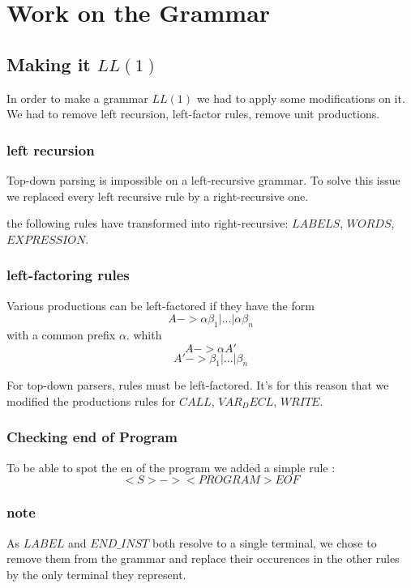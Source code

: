 \newpage\cleardoublepage{}
\section{Work on the Grammar}


\subsection{Making it $LL(1)$}
In order to make a grammar $LL(1)$ we had to apply some modifications on it. We had to remove left recursion, left-factor rules, remove unit productions.

\subsubsection{left recursion}

Top-down parsing is impossible on a left-recursive grammar. To solve this issue we replaced every left recursive rule by a right-recursive one.

the following rules have transformed into right-recursive: $LABELS$, $WORDS$, $EXPRESSION$.


\subsubsection{left-factoring rules}
Various productions can be left-factored if they have the form
$$A -> \alpha \beta_{1} | ... | \alpha\beta_{n}$$
with a common prefix $\alpha$.
whith
$$A -> \alpha A'$$
$$A' -> \beta_{1} | ... | \beta_{n}$$

For top-down parsers, rules must be left-factored.
It's for this reason that we modified the productions rules for
$CALL$, $VAR_DECL$, $WRITE$.


\subsubsection{Checking end of Program}

To be able to spot the en of the program we added a simple rule :
$$<S> -> <PROGRAM> EOF$$

\subsubsection{note}

As $LABEL$ and $END\_INST$ both resolve to a single terminal, we chose to remove them from the grammar and replace their occurences in the other rules by the only terminal they represent.

